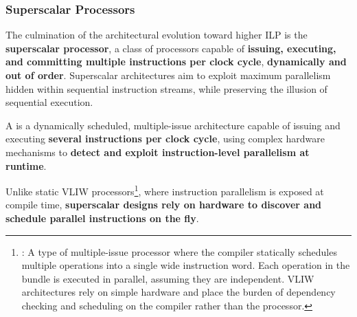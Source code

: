 \subsubsection{Superscalar Processors}\label{subsubsection: Superscalar Processors}

The culmination of the architectural evolution toward higher ILP is the \textbf{superscalar processor}, a class of processors capable of \textbf{issuing, executing, and committing multiple instructions per clock cycle}, \textbf{dynamically and out of order}. Superscalar architectures aim to exploit maximum parallelism hidden within sequential instruction streams, while preserving the illusion of sequential execution.

\highspace
\begin{definitionbox}
    A  is a dynamically scheduled, multiple-issue architecture capable of issuing and executing \textbf{several instructions per clock cycle}, using complex hardware mechanisms to \textbf{detect and exploit instruction-level parallelism at runtime}.
\end{definitionbox}

\noindent
Unlike static VLIW processors\footnote{%
    : A type of multiple-issue processor where the compiler statically schedules multiple operations into a single wide instruction word. Each operation in the bundle is executed in parallel, assuming they are independent. VLIW architectures rely on simple hardware and place the burden of dependency checking and scheduling on the compiler rather than the processor.
}, where instruction parallelism is exposed at compile time, \textbf{superscalar designs rely on hardware to discover and schedule parallel instructions on the fly}.

